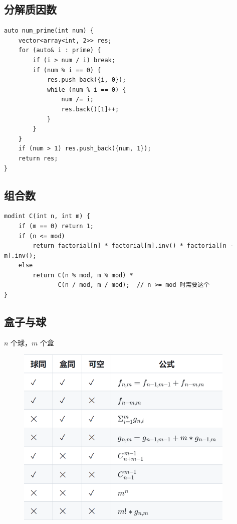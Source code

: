 \documentclass[UTF8]{ctexart}
\begin{document}
\begin{sloppypar}
\subsection{分解质因数}

\begin{lstlisting}[style=cpp]
auto num_prime(int num) {
    vector<array<int, 2>> res;
    for (auto& i : prime) {
        if (i > num / i) break;
        if (num % i == 0) {
            res.push_back({i, 0});
            while (num % i == 0) {
                num /= i;
                res.back()[1]++;
            }
        }
    }
    if (num > 1) res.push_back({num, 1});
    return res;
}
\end{lstlisting}

\subsection{组合数}

\begin{lstlisting}[style=cpp]
modint C(int n, int m) {
    if (m == 0) return 1;
    if (n <= mod)
        return factorial[n] * factorial[m].inv() * factorial[n - m].inv();
    else
        return C(n % mod, m % mod) *
               C(n / mod, m / mod);  // n >= mod 时需要这个
}
\end{lstlisting}

\subsection{盒子与球}

$n$ 个球，$m$ 个盒

\begin{figure}
    \flushleft
    \includegraphics[]{box-and-ball.png}
    \label{fig:left}
\end{figure}


\end{sloppypar}
\end{document}

